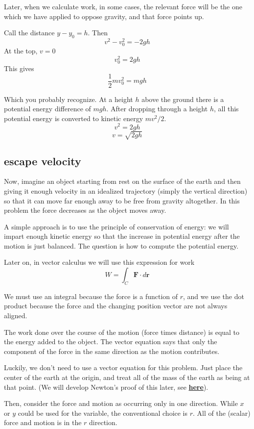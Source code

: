 \documentclass[11pt, oneside]{article}
\begin{document}
Later, when we calculate work, in some cases, the relevant force will be the one which we have applied to oppose gravity, and that force points up.

Call the distance $y - y_0 = h$.  Then
\[ v^2 - v_0^2 = - 2gh \]
At the top, $v = 0$
\[ v_0^2 = 2gh \]
This gives
\[ \frac{1}{2} mv_0^2 = mgh \]

Which you probably recognize.  At a height $h$ above the ground there is a potential energy difference of $mgh$.  After dropping through a height $h$, all this potential energy is converted to kinetic energy $mv^2/2$.
\[ v^2 = 2gh \]
\[ v = \sqrt{2gh} \]

\subsection*{escape velocity}

Now, imagine an object starting from rest on the surface of the earth and then giving it enough velocity in an idealized trajectory (simply the vertical direction) so that it can move far enough away to be free from gravity altogether.  In this problem the force decreases as the object moves away.

A simple approach is to use the principle of conservation of energy:  we will impart enough kinetic energy so that the increase in potential energy after the motion is just balanced.  The question is how to compute the potential energy.

Later on, in vector calculus we will use this expression for work
\[ W = \int_C \mathbf{F} \cdot d \mathbf{r} \]

We must use an integral because the force is a function of $r$, and we use the dot product because the force and the changing position vector are not always aligned.

The work done over the course of the motion (force times distance) is equal to the energy added to the object.  The vector equation says that only the component of the force in the same direction as the motion contributes.

Luckily, we don't need to use a vector equation for this problem.  Just place the center of the earth at the origin, and treat all of the mass of the earth as being at that point.  (We will develop Newton's proof of this later, see \hyperref[sec:Newton_point_mass]{\textbf{here}}). 

Then, consider the force and motion as occurring only in one direction.  While $x$ or $y$  could be used for the variable, the conventional choice is $r$.  All of the (scalar) force and motion is in the $r$ direction.
\end{document}
